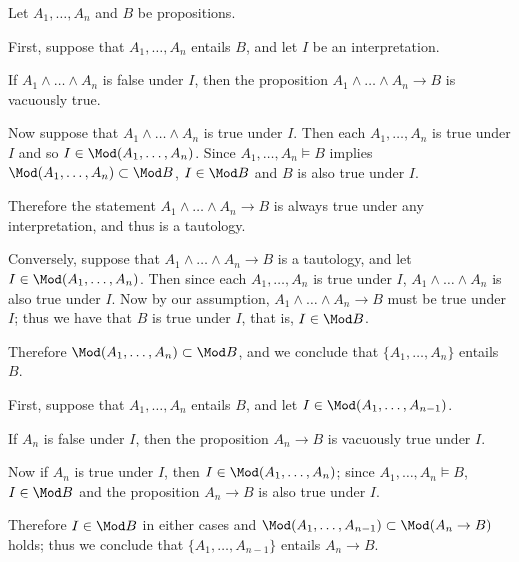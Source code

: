 \begin{myproof}
    Let \(A_1,\dots,A_n\) and \(B\) be propositions.
    \begin{nlist}
        \item First, suppose that \(A_1,\dots,A_n\) entails \(B\),
        and let \(I\) be an interpretation.
        
        If \(A_1\wedge\dots\wedge A_n\) is false under \(I\),
        then the proposition \(A_1\wedge\dots\wedge A_n\to B\)
        is vacuously true.
        
        Now suppose that
        \(A_1\wedge\dots\wedge A_n\) is true under \(I\).
        Then each \(A_1,\dots,A_n\) is true under \(I\)
        and so \(I\in\Mod(A_1,\dots,A_n)\).
        Since \(A_1,\dots,A_n\models B\) implies
        \(\Mod(A_1,\dots,A_n)\subset\Mod B\),
        \(I\in\Mod B\) and \(B\) is also true under \(I\).

        Therefore the statement \(A_1\wedge\dots\wedge A_n\to B\)
        is always true under any interpretation,
        and thus is a tautology.

        Conversely,
        suppose that \(A_1\wedge\dots\wedge A_n\to B\) is a tautology,
        and let \(I\in\Mod(A_1,\dots,A_n)\).
        Then since each \(A_1,\dots,A_n\) is true under \(I\),
        \(A_1\wedge\dots\wedge A_n\) is also true under \(I\).
        Now by our assumption,
        \(A_1\wedge\dots\wedge A_n\to B\) must be true under \(I\);
        thus we have that
        \(B\) is true under \(I\), that is, \(I\in\Mod B\).

        Therefore \(\Mod(A_1,\dots,A_n)\subset\Mod B\),
        and we conclude that \(\{A_1,\dots,A_n\}\) entails \(B\).

        \item First, suppose that \(A_1,\dots,A_n\) entails \(B\),
        and let \(I\in\Mod(A_1,\dots,A_{n-1})\).

        If \(A_n\) is false under \(I\),
        then the proposition \(A_n\to B\) is vacuously true under \(I\).

        Now if \(A_n\) is true under \(I\),
        then \(I\in\Mod(A_1,\dots,A_n)\);
        since \(A_1,\dots,A_n\models B\),
        \(I\in\Mod B\)
        and the proposition \(A_n\to B\) is also true under \(I\).

        Therefore \(I\in\Mod B\) in either cases
        and \(\Mod(A_1,\dots,A_{n-1})\subset\Mod(A_n\to B)\) holds;
        thus we conclude that
        \(\{A_1,\dots,A_{n-1}\}\) entails \(A_n\to B\).


\end{nlist}
\end{myproof}
